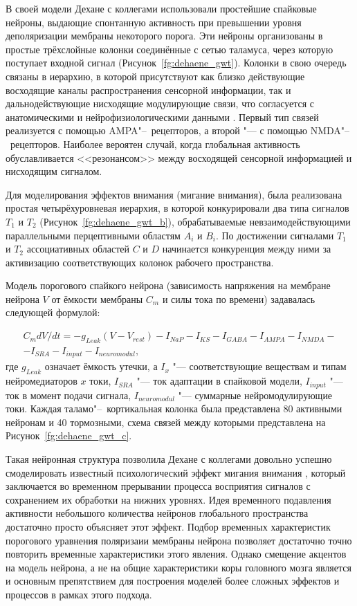 В своей модели Дехане с коллегами использовали простейшие спайковые нейроны, выдающие спонтанную активность при превышении уровня деполяризации мембраны некоторого порога. Эти нейроны организованы в простые трёхслойные колонки соединённые с сетью таламуса, через которую поступает входной сигнал (Рисунок~\ref{fg:dehaene_gwt}). Колонки в свою очередь связаны в иерархию, в которой присутствуют как близко действующие восходящие каналы распространения сенсорной информации, так и дальнодействующие нисходящие модулирующие связи, что согласуется с анатомическими и нейрофизиологическими данными \cite{Lamme2000,Felleman1991}. Первый тип связей реализуется с помощью AMPA"--~рецепторов, а второй "--- с помощью NMDA"--~рецепторов. Наиболее вероятен случай, когда глобальная активность обуславливается <<резонансом>> \cite{Llinas1998} между восходящей сенсорной информацией и нисходящим сигналом.

Для моделирования эффектов внимания (мигание внимания), была реализована простая четырёхуровневая иерархия, в которой конкурировали два типа сигналов $T_1$ и $T_2$ (Рисунок~\ref{fg:dehaene_gwt_b}), обрабатываемые невзаимодействующими параллельными перцептивными областям $A_i$ и $B_i$. По достижении сигналами $T_1$ и $T_2$ ассоциативных областей $C$ и $D$ начинается конкуренция между ними за активизацию соответствующих колонок рабочего пространства.

Модель порогового спайкого нейрона (зависимость напряжения на мембране нейрона $V$ от ёмкости мембраны $C_m$ и силы тока по времени) задавалась следующей формулой:

\begin{equation}
	\begin{split}
		C_mdV/dt=-g_{Leak}(V-V_{rest})-I_{NaP}-I_{KS}-I_{GABA}-I_{AMPA}-I_{NMDA}-\\
		-I_{SRA}-I_{input}-I_{neuromodul},
	\end{split}
\end{equation}
где $g_{Leak}$ означает ёмкость утечки, а $I_x$ "--- соответствующие веществам и типам нейромедиаторов $x$ токи, $I_{SRA}$ "--- ток адаптации в спайковой модели, $I_{input}$ "--- ток в момент подачи сигнала, $I_{neuromodul}$ "--- суммарные нейромодулирующие токи. Каждая таламо"--~кортикальная колонка была представлена 80 активными нейронам и 40 тормозными, схема связей между которыми представлена на Рисунок~\ref{fg:dehaene_gwt_c}.

Такая нейронная структура позволила Дехане с коллегами довольно успешно смоделировать известный психологический эффект мигания внимания \cite{Raymond1992}, который заключается во временном прерывании процесса восприятия сигналов с сохранением их обработки на нижних уровнях. Идея временного подавления активности небольшого количества нейронов глобального пространства достаточно просто объясняет этот эффект. Подбор временных характеристик порогового уравнения поляризаии мембраны нейрона позволяет достаточно точно повторить временные характеристики этого явления. Однако смещение акцентов на модель нейрона, а не на общие характеристики коры головного мозга является и основным препятствием для построения моделей более сложных эффектов и процессов в рамках этого подхода.

